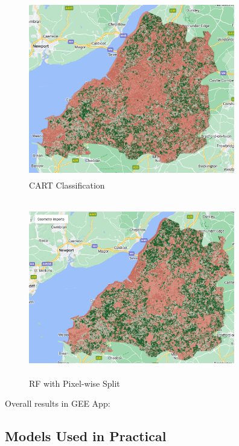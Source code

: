 \documentclass[
  letterpaper,
  DIV=11,
  numbers=noendperiod]{scrreprt}
\begin{document}
\begin{figure}

{\centering \includegraphics[width=3.54167in,height=3.02083in]{images/wk7/basic_classifier.png}

}

\caption{CART Classification}

\end{figure}

\begin{figure}

{\centering \includegraphics[width=3.54167in,height=3.02083in]{images/wk7/pixel_wise_classifier.png}

}

\caption{RF with Pixel-wise Split}

\end{figure}

Overall results in GEE App:

\hypertarget{models-used-in-practical}{%
\subsection*{Models Used in Practical}\label{models-used-in-practical}}
\end{document}
